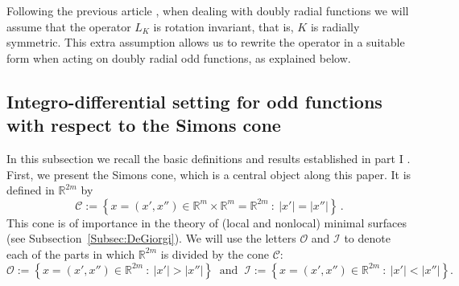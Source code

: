 \documentclass[12pt,reqno]{amsart}
\theoremstyle{definition}
\theoremstyle{remark}
\newcommand{\con}[1]{\mathbb{#1}}
\newcommand{\R}{\con{R}} %
\newcommand{\ccal}{\mathscr{C}}
\newcommand{\ical}{\mathcal{I}}
\newcommand{\ocal}{\mathcal{O}}
\newcommand{\setcond}[2]{\left \{ #1 \ : \ #2  \right \}}
\numberwithin{equation}{section}
\begin{document}
Following the previous article \cite{FelipeSanz-Perela:IntegroDifferentialI}, when dealing with doubly radial functions we will assume that the operator $L_K$ is rotation invariant, that is, $K$ is radially symmetric. This extra assumption allows us to rewrite the operator in a suitable form when acting on doubly radial odd functions, as explained below.


\subsection{Integro-differential setting for odd functions with respect to the Simons cone}
\label{Subsec:Integro-differential setting}



In this subsection we recall the basic definitions and results established in part I \cite{FelipeSanz-Perela:IntegroDifferentialI}. First, we present the Simons cone, which is a central object along this paper. It is defined in $\R^{2m}$ by
$$
\mathscr{C} := \setcond{x = (x', x'') \in \R^m \times \R^m = \R^{2m}}{|x'| = |x''|}\,.
$$
This cone is of importance in the theory of (local and nonlocal) minimal surfaces (see Subsection~\ref{Subsec:DeGiorgi}). 
We will use the letters $\ocal$ and $\ical$ to denote each of the parts in which $\R^{2m}$ is divided by the cone $\ccal$:
$$
\ocal:= \setcond{x = (x', x'') \in \R^{2m}}{|x'| > |x''|} \ \textrm{ and } \
\ical:= \setcond{x = (x', x'') \in \R^{2m}}{|x'| < |x''|}.
$$
\end{document}
